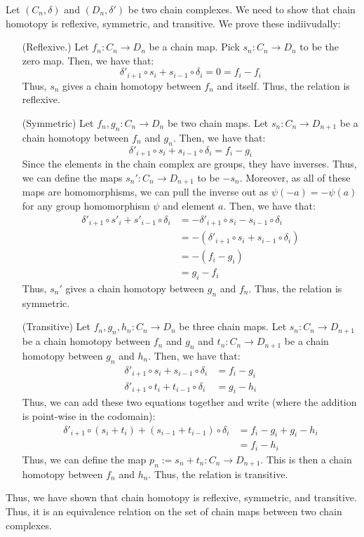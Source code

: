 \documentclass[12pt]{article}
\begin{document}
\begin{solution}
    Let $(C_n, \delta)$ and $(D_n, \delta')$ be two chain complexes. We need to show that chain homotopy is reflexive, symmetric, and transitive. We prove these indiivudally:
    \begin{itemize}
        \item[(Reflexive.)] Let $f_n: C_n \to D_n$ be a chain map. Pick $s_n: C_n \to D_n$ to be the zero map. Then, we have that: 
        \[ \delta'_{i+1} \circ s_i + s_{i-1} \circ \delta_i = 0 = f_i - f_i\]
        Thus, $s_n$ gives a chain homotopy between $f_n$ and itself. Thus, the relation is reflexive. 
        \item[(Symmetric)] Let $f_n, g_n: C_n \to D_n$ be two chain maps. Let $s_n: C_n \to D_{n+1}$ be a chain homotopy between $f_n$ and $g_n$. Then, we have that:
        \[ \delta'_{i+1} \circ s_i + s_{i-1} \circ \delta_i = f_i - g_i\]
        Since the elements in the chain complex are groups, they have inverses. Thus, we can define the maps $s_n': C_n \to D_{n+1}$ to be $-s_n$. Moreover, as all of these maps are homomorphisms, we can pull the inverse out as $\psi(-a) = -\psi(a)$ for any group homomorphism $\psi$ and element $a$. Then, we have that:
        \begin{align*}
            \delta'_{i+1} \circ s'_i + s'_{i-1} \circ \delta_i &= -\delta'_{i+1} \circ s_i - s_{i-1} \circ \delta_i\\ 
            &= -\left( \delta'_{i+1} \circ s_i + s_{i-1} \circ \delta_i \right) \\
            &= -\left( f_i - g_i \right) \\
            &= g_i - f_i
        \end{align*}
        Thus, $s_n'$ gives a chain homotopy between $g_n$ and $f_n$. Thus, the relation is symmetric.
        \item[(Transitive)] Let $f_n, g_n, h_n: C_n \to D_n$ be three chain maps. Let $s_n: C_n \to D_{n+1}$ be a chain homotopy between $f_n$ and $g_n$ and $t_n: C_n \to D_{n+1}$ be a chain homotopy between $g_n$ and $h_n$. Then, we have that:
        \begin{align*}
            \delta'_{i+1} \circ s_i + s_{i-1} \circ \delta_i &= f_i - g_i\\
            \delta'_{i+1} \circ t_i + t_{i-1} \circ \delta_i &= g_i - h_i
        \end{align*}
        Thus, we can add these two equations together and write (where the addition is point-wise in the codomain):
        \begin{align*}
            \delta'_{i+1} \circ (s_i + t_i) + (s_{i-1} + t_{i-1}) \circ \delta_i &= f_i - g_i + g_i - h_i\\
            &= f_i - h_i
        \end{align*}
        Thus, we can define the map $p_n := s_n + t_n: C_n \to D_{n+1}$. This is then a chain homotopy between $f_n$ and $h_n$. Thus, the relation is transitive.
    \end{itemize}
    Thus, we have shown that chain homotopy is reflexive, symmetric, and transitive. Thus, it is an equivalence relation on the set of chain maps between two chain complexes.
\end{solution}
\end{document}
